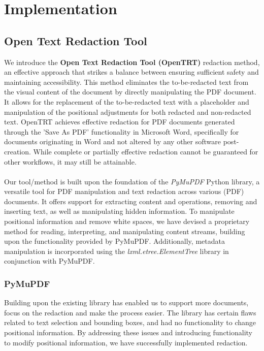 \chapter{Implementation}

\section{Open Text Redaction Tool}
We introduce the \textbf{Open Text Redaction Tool (OpenTRT)} redaction method, an effective approach that strikes a balance between ensuring sufficient safety and maintaining accessibility. This method eliminates the to-be-redacted text from the visual content of the document by directly manipulating the PDF document. It allows for the replacement of the to-be-redacted text with a placeholder and manipulation of the positional adjustments for both redacted and non-redacted text. OpenTRT achieves effective redaction for PDF documents generated through the 'Save As PDF' functionality in Microsoft Word, specifically for documents originating in Word and not altered by any other software post-creation. While complete or partially effective redaction cannot be guaranteed for other workflows, it may still be attainable.
\\\\
Our tool/method is built upon the foundation of the \textit{PyMuPDF} \cite{PyMuPDF} Python library, a versatile tool for PDF manipulation and text redaction across various (PDF) documents. It offers support for extracting content and operations, removing and inserting text, as well as manipulating hidden information. To manipulate positional information and remove white spaces, we have devised a proprietary method for reading, interpreting, and manipulating content streams, building upon the functionality provided by PyMuPDF. Additionally, metadata manipulation is incorporated using the \textit{lxml.etree.ElementTree} library in conjunction with PyMuPDF.

\subsection{PyMuPDF}
Building upon the existing library has enabled us to support more documents, focus on the redaction and make the process easier. The library has certain flaws related to text selection and bounding boxes, and had no functionality to change positional information.  By addressing these issues and introducing functionality to modify positional information, we have successfully implemented redaction.


